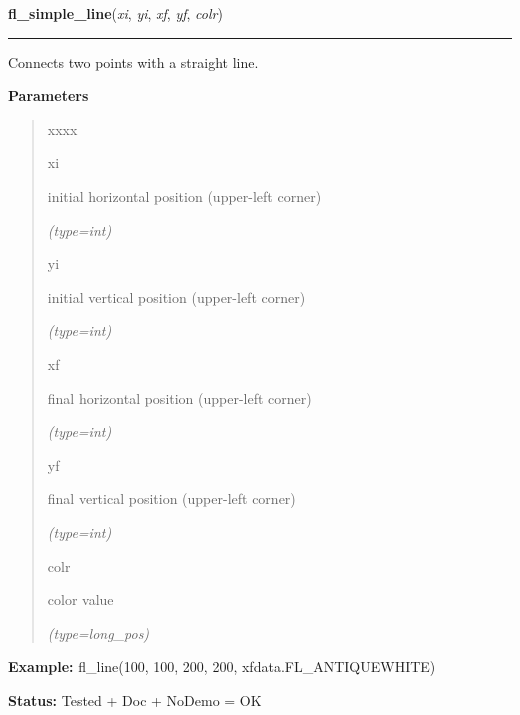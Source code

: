     \label{xformslib:flxbasic:fl_line}

    \vspace{0.5ex}

\hspace{.8\funcindent}\begin{boxedminipage}{\funcwidth}

    \raggedright \textbf{fl\_simple\_line}(\textit{xi}, \textit{yi}, \textit{xf}, \textit{yf}, \textit{colr})

    \vspace{-1.5ex}

    \rule{\textwidth}{0.5\fboxrule}
\setlength{\parskip}{2ex}
    Connects two points with a straight line.

\setlength{\parskip}{1ex}
      \textbf{Parameters}
      \vspace{-1ex}

      \begin{quote}
        \begin{Ventry}{xxxx}

          \item[xi]

          initial horizontal position (upper-left corner)

            {\it (type=int)}

          \item[yi]

          initial vertical position (upper-left corner)

            {\it (type=int)}

          \item[xf]

          final horizontal position (upper-left corner)

            {\it (type=int)}

          \item[yf]

          final vertical position (upper-left corner)

            {\it (type=int)}

          \item[colr]

          color value

            {\it (type=long\_pos)}

        \end{Ventry}

      \end{quote}

\textbf{Example:} fl\_line(100, 100, 200, 200, xfdata.FL\_ANTIQUEWHITE)



\textbf{Status:} Tested + Doc + NoDemo = OK



    \end{boxedminipage}

